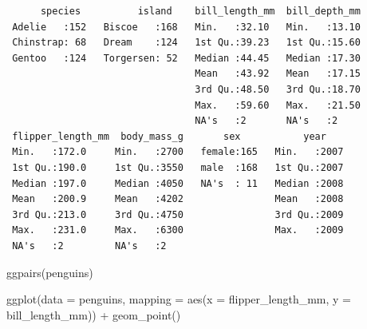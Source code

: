\documentclass[
  letterpaper,
  DIV=11,
  numbers=noendperiod]{scrartcl}
\newenvironment{Shaded}{\begin{snugshade}}{\end{snugshade}}
\newcommand{\AttributeTok}[1]{\textcolor[rgb]{0.40,0.45,0.13}{#1}}
\newcommand{\FunctionTok}[1]{\textcolor[rgb]{0.28,0.35,0.67}{#1}}
\newcommand{\NormalTok}[1]{\textcolor[rgb]{0.00,0.23,0.31}{#1}}
\newcommand{\SpecialCharTok}[1]{\textcolor[rgb]{0.37,0.37,0.37}{#1}}
\begin{document}
\begin{verbatim}
      species          island    bill_length_mm  bill_depth_mm  
 Adelie   :152   Biscoe   :168   Min.   :32.10   Min.   :13.10  
 Chinstrap: 68   Dream    :124   1st Qu.:39.23   1st Qu.:15.60  
 Gentoo   :124   Torgersen: 52   Median :44.45   Median :17.30  
                                 Mean   :43.92   Mean   :17.15  
                                 3rd Qu.:48.50   3rd Qu.:18.70  
                                 Max.   :59.60   Max.   :21.50  
                                 NA's   :2       NA's   :2      
 flipper_length_mm  body_mass_g       sex           year     
 Min.   :172.0     Min.   :2700   female:165   Min.   :2007  
 1st Qu.:190.0     1st Qu.:3550   male  :168   1st Qu.:2007  
 Median :197.0     Median :4050   NA's  : 11   Median :2008  
 Mean   :200.9     Mean   :4202                Mean   :2008  
 3rd Qu.:213.0     3rd Qu.:4750                3rd Qu.:2009  
 Max.   :231.0     Max.   :6300                Max.   :2009  
 NA's   :2         NA's   :2                                 
\end{verbatim}

\begin{Shaded}
\begin{Highlighting}[]
\FunctionTok{ggpairs}\NormalTok{(penguins) }


\FunctionTok{ggplot}\NormalTok{(}\AttributeTok{data =}\NormalTok{ penguins,}
       \AttributeTok{mapping =} \FunctionTok{aes}\NormalTok{(}\AttributeTok{x =}\NormalTok{ flipper\_length\_mm, }
                     \AttributeTok{y =}\NormalTok{ bill\_length\_mm)) }\SpecialCharTok{+} 
  \FunctionTok{geom\_point}\NormalTok{()}
\end{Highlighting}
\end{Shaded}
\end{document}
